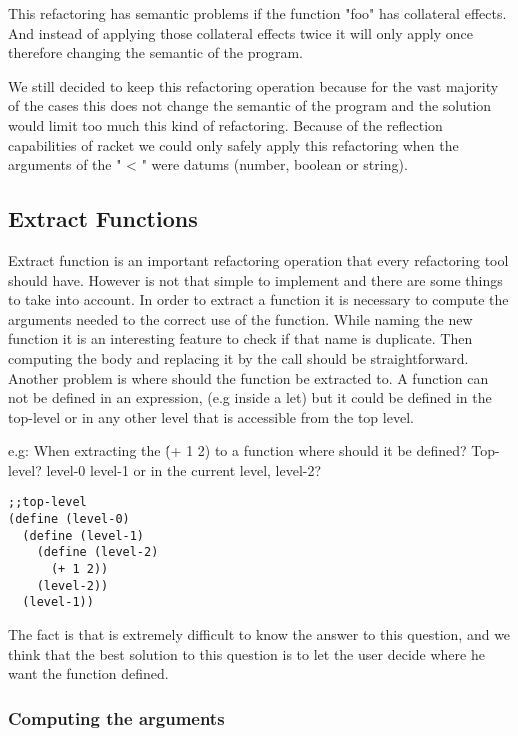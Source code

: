 This refactoring has semantic problems if the function "foo" has collateral effects. %
And instead of applying those collateral effects twice it will only apply once therefore
changing the semantic of the program.

We still decided to keep this refactoring operation because for the vast majority
of the cases this does not change the semantic of the program and the solution
would limit too much this kind of refactoring. Because of the reflection capabilities
of racket we could only safely apply this refactoring when the arguments of the
" < " were datums (number, boolean or string).

\subsection{Extract Functions}
Extract function is an important refactoring operation that every refactoring tool
should have. However is not that simple to implement and there are some things to
take into account.
In order to extract a function it is necessary to compute the arguments needed
to the correct use of the function. While naming the new function it is an interesting
feature to check if that name is duplicate.
Then computing the body and replacing it by the call should be straightforward.
Another problem is where should the function be extracted to. A function can not
be defined in an expression, (e.g inside a let) but it could be defined in the top-level
or in any other level that is accessible from the top level.

e.g: When extracting the \'(+ 1 2) to a function where should it be defined?
Top-level? level-0 level-1 or in the current level, level-2?
\begin{lstlisting}[basicstyle=\ttfamily, caption="Example"]
;;top-level
(define (level-0)
  (define (level-1)
    (define (level-2)
      (+ 1 2))
    (level-2))
  (level-1))
\end{lstlisting}

The fact is that is extremely difficult to know the answer to this question, and
we think that the best solution to this question is to let the user decide where
he want the function defined.


\subsubsection{Computing the arguments}


